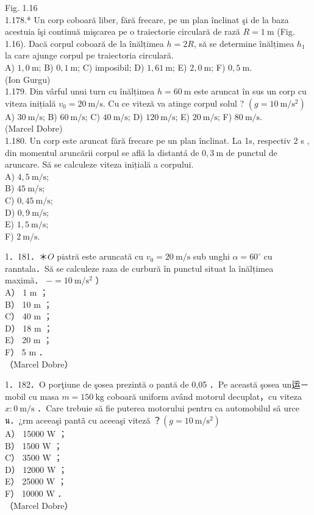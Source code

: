 \documentclass[10pt]{article}
\begin{document}
Fig. 1.16\\
1.178.* Un corp coboară liber, fără frecare, pe un plan înclinat şi de la baza acestuia îşi continuă mişcarea pe o traiectorie circulară de rază $R=1 \mathrm{~m}$ (Fig. 1.16). Dacă corpul coboară de la înălțimea $h=2 R$, să se determine înălțimea $h_{1}$ la care ajunge corpul pe traiectoria circulară.\\
A) $1,0 \mathrm{~m}$; B) $0,1 \mathrm{~m}$; C) imposibil; D) $1,61 \mathrm{~m}$; E) $2,0 \mathrm{~m}$; F) $0,5 \mathrm{~m}$.\\
(Ion Gurgu)\\
1.179. Din vârful unui turn cu înălțimea $h=60 \mathrm{~m}$ este aruncat în sus un corp cu viteza inițială $v_{0}=20 \mathrm{~m} / \mathrm{s}$. Cu ce viteză va atinge corpul solul ? $\left(g=10 \mathrm{~m} / \mathrm{s}^{2}\right)$\\
A) $30 \mathrm{~m} / \mathrm{s}$; B) $60 \mathrm{~m} / \mathrm{s}$; C) $40 \mathrm{~m} / \mathrm{s}$; D) $120 \mathrm{~m} / \mathrm{s}$; E) $20 \mathrm{~m} / \mathrm{s}$; F) $80 \mathrm{~m} / \mathrm{s}$.\\
(Marcel Dobre)\\
1.180. Un corp este aruncat fără frecare pe un plan înclinat. La 1s, respectiv 2 s , din momentul aruncării corpul se află la distantá de $0,3 \mathrm{~m}$ de punctul de aruncare. Să se calculeze viteza inițială a corpului.\\
A) $4,5 \mathrm{~m} / \mathrm{s}$;\\
B) $45 \mathrm{~m} / \mathrm{s}$;\\
C) $0,45 \mathrm{~m} / \mathrm{s}$;\\
D) $0,9 \mathrm{~m} / \mathrm{s}$;\\
E) $1,5 \mathrm{~m} / \mathrm{s}$;\\
F) $2 \mathrm{~m} / \mathrm{s}$.

1．181．＊$O$ piatră este aruncată cu $v_{0}=20 \mathrm{~m} / \mathrm{s}$ sub unghi $\alpha=60^{\circ}$ cu ranntala．Să se calculeze raza de curbură în punctul situat la înălțimea maximă． $-=10 \mathrm{~m} / \mathrm{s}^{2}$ ）\\
A） 1 m ；\\
B） 10 m ；\\
C） 40 m ；\\
D） 18 m ；\\
E） 20 m ；\\
F） 5 m ．\\
（Marcel Dobre）

1．182．O porţiune de şosea prezintă o pantă de 0,05 ．Pe această şosea un运－mobil cu masa $m=150 \mathrm{~kg}$ coboară uniform având motorul decuplat，cu viteza $x: 0 \mathrm{~m} / \mathrm{s}$ ．Care trebuie să fie puterea motorului pentru ca automobilul să urce น．¿rm aceeaşi pantã cu aceeaşi viteză ？$\left(g=10 \mathrm{~m} / \mathrm{s}^{2}\right)$\\
A） 15000 W ；\\
B） 1500 W ；\\
C） 3500 W ；\\
D） 12000 W ；\\
E） 25000 W ；\\
F） 10000 W ．\\
（Marcel Dobre）
\end{document}
